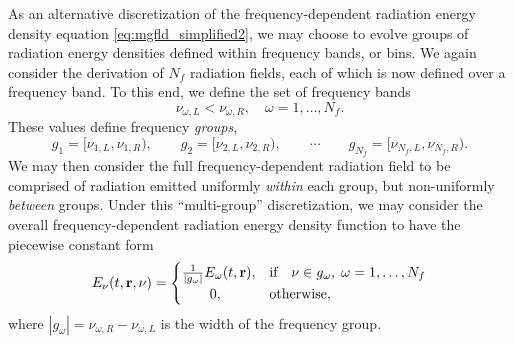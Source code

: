 \documentclass[10pt]{article}
\renewcommand{\(}{\left(}
\renewcommand{\)}{\right)}
\newcommand{\rvec}{{\bf r}}
\newcommand{\Enu}{E_{\nu}}
\begin{document}
As an alternative discretization of the frequency-dependent radiation
energy density equation \eqref{eq:mgfld_simplified2}, we may choose to
evolve groups of radiation energy densities defined within frequency
bands, or bins.  We again consider the derivation of $N_f$ radiation
fields, each of which is now defined over a frequency band.  To this
end, we define the set of frequency bands
\begin{equation}
\label{eq:bin_bounds}
  \nu_{\omega,L} < \nu_{\omega,R},\quad \omega=1,\ldots,N_f.
\end{equation}
These values define frequency {\em groups}, 
\begin{equation}
\label{eq:frequency_groups}
  g_1 = [\nu_{1,L},\nu_{1,R}), \qquad   g_2 = [\nu_{2,L},\nu_{2,R}), 
  \qquad \cdots \qquad
  g_{N_f} = [\nu_{N_f,L},\nu_{N_f,R}).
\end{equation}
We may then consider the full frequency-dependent radiation field to
be comprised of radiation emitted uniformly {\em within} each group,
but non-uniformly {\em between} groups.  Under this ``multi-group''
discretization, we may consider the overall frequency-dependent
radiation energy density function to have the piecewise constant form  
\begin{equation}
\label{eq:multigroup_radiation}
  \Enu(t,\rvec,\nu) = \begin{cases}
    \frac{1}{|g_{\omega}|}E_{\omega}(t,\rvec), & 
    \text{if}\quad \nu \in g_{\omega}, \; \omega=1,\ldots,N_f\\
    \qquad 0, & \text{otherwise},
  \end{cases}
\end{equation}
where $|g_{\omega}| = \nu_{\omega,R}-\nu_{\omega,L}$ is the width of
the frequency group.
\end{document}

